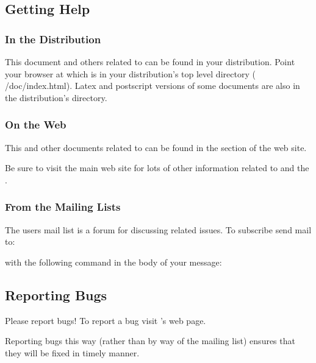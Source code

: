 \subsection{Getting Help}
\label{sec:help}

\subsubsection{In the Distribution}

This document and others related to \sr{} can be found in your \sr{}
distribution.  Point your browser at  which is in your
distribution's top level  directory (\ie{} /doc/index.html).  Latex and postscript versions of some
documents are also in the distribution's  directory.

\subsubsection{On the Web}

This and other documents related to \sr{} can be found in the
 section of the
\htmladdnormallinkfoot{\sci{}}{\sciurl{}} web site.

Be sure to visit the main \sci{} web site for lots of other
information related to \sr{} and the \scii{}.

\subsubsection{From the Mailing Lists}

The \sr{} users mail list is a forum for discussing \sr{} related issues.
To subscribe send mail to:


with the following command in the body of your message:


\subsection{Reporting Bugs}
\label{sec:bugs}

Please report bugs!  To report a bug visit \sr{}'s
 web page.

Reporting bugs this way (rather than by way of the mailing list) ensures
that they will be fixed in timely manner.



